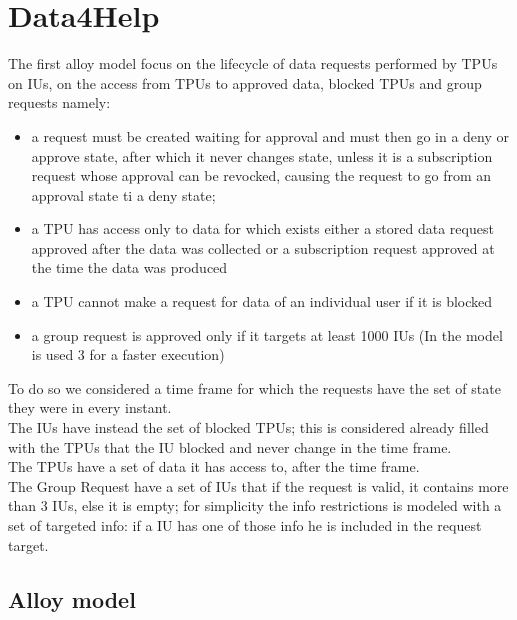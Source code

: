 \section{Data4Help}
The first alloy model focus on the lifecycle of data requests performed by TPUs on IUs, on the access from TPUs to approved data, blocked TPUs and group requests namely:
\begin{itemize}
\item a request must be created waiting for approval and must then go in a deny or approve state, after which it never changes state, unless it is a subscription request whose approval can be revocked, causing the request to go from an approval state ti a deny state;
\item a TPU has access only to data for which exists either a stored data request approved after the data was collected or a subscription request approved at the time the data was produced
\item a TPU cannot make a request for data of an individual user if it is blocked
\item a group request is approved only if it targets at least 1000 IUs (In the model is used 3 for a faster execution)
\end{itemize}
To do so we considered a time frame for which the requests have the set of state they were in every instant.  \\
The IUs have instead the set of blocked TPUs; this is considered already filled with the TPUs that the IU blocked and never change in the time frame. \\ 
The TPUs have a set of data it has access to, after the time frame. \\
The Group Request have a set of IUs that if the request is valid, it contains more than 3 IUs, else it is empty; for simplicity the info restrictions is modeled with a set of targeted info: if a IU has one of those info he is included in the request target.
\\
\subsection{Alloy model}

